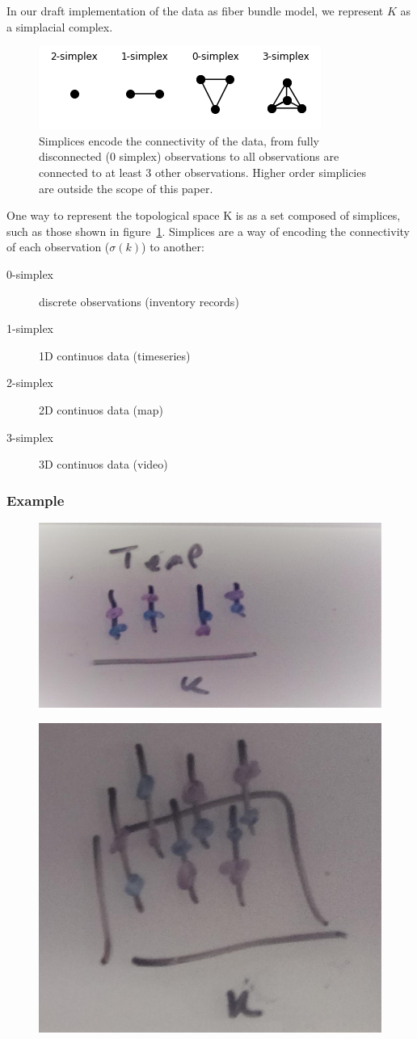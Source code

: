 \documentclass[../main.tex]{subfiles}
\begin{document}
In our draft implementation of the data as fiber bundle model, we represent $K$ as a simplacial complex. 

\begin{figure}[H]
    \label{fig:simplex}
    \includegraphics{figures/sections/math/simplex.png}
    \caption{Simplices encode the connectivity of the data, from fully disconnected (0 simplex) observations to all observations are connected to at least 3 other observations. Higher order simplicies are outside the scope of this paper.}
\end{figure}

One way to represent the topological space K is as a set composed of simplices, such as those shown in figure~\ref{fig:simplex}. Simplices are a way of encoding the connectivity of each observation ($\sigma(k)$) to another: %

\begin{description}
    \item[0-simplex] discrete observations (inventory records)
    \item[1-simplex] 1D continuos data (timeseries)
    \item[2-simplex] 2D continuos data (map)
    \item[3-simplex] 3D continuos data (video)
\end{description}


\subsubsection{Example}
\begin{figure}[ht]
    \includegraphics[width=0.2\linewidth]{figures/sections/math/temp_1k.png}
    \label{fig:k_data}
\end{figure}

\begin{figure}[H]
    \includegraphics[width=0.2\linewidth]{figures/sections/math/temp_2k.png}
\end{figure}
\end{document}
